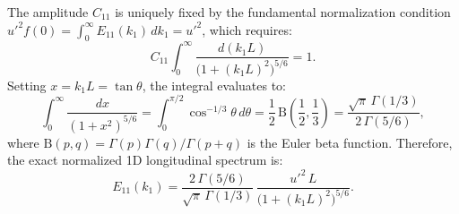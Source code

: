\documentclass[lineno]{jfm}
\begin{document}
The amplitude $C_{11}$ is uniquely fixed by the fundamental normalization condition $u'^2 f(0) = \int_0^\infty E_{11}(k_1)\,dk_1 = u'^2$, which requires:
\begin{equation}
C_{11} \int_0^\infty \frac{d(k_1 L)}{\big(1 + (k_1 L)^2\big)^{5/6}} = 1.
\end{equation}
Setting $x = k_1 L = \tan\theta$, the integral evaluates to:
\begin{equation}
\int_0^\infty \frac{dx}{(1 + x^2)^{5/6}} = \int_0^{\pi/2} \cos^{-1/3}\theta\,d\theta = \frac{1}{2}\,\mathrm{B}\left(\frac{1}{2}, \frac{1}{3}\right) = \frac{\sqrt{\pi}\,\Gamma(1/3)}{2\,\Gamma(5/6)},
\end{equation}
where $\mathrm{B}(p, q) = \Gamma(p)\Gamma(q)/\Gamma(p+q)$ is the Euler beta function. Therefore, the exact normalized 1D longitudinal spectrum is:
\begin{equation}
E_{11}(k_1) = \frac{2\,\Gamma(5/6)}{\sqrt{\pi}\,\Gamma(1/3)}\,\frac{u'^2\,L}{\big(1 + (k_1 L)^2\big)^{5/6}}.
\label{eq:app_E11_exact}
\end{equation}
\end{document}
